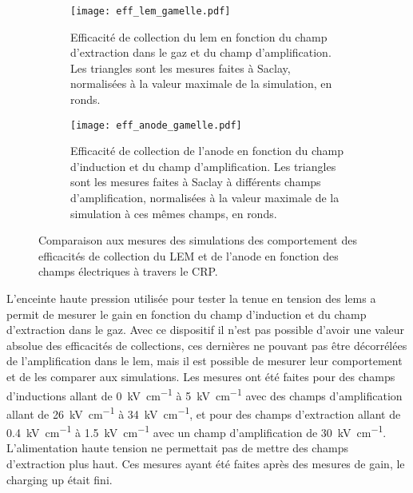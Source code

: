       \begin{figure}[!htb]
        \begin{subfigure}{0.48\textwidth}
          \centering
          \texttt{[image: eff\_lem\_gamelle.pdf]}
          \caption{\label{fig::eff_lem_gamelle}Efficacité de collection du \gls{lem} en fonction du champ d'extraction dans le gaz et du champ d'amplification. Les triangles sont les mesures faites à Saclay, normalisées à la valeur maximale de la simulation, en ronds.}
        \end{subfigure}\hfill
        \begin{subfigure}{0.48\textwidth}
          \centering
          \texttt{[image: eff\_anode\_gamelle.pdf]}
          \caption{\label{fig::eff_anode_gamelle}Efficacité de collection de l'anode en fonction du champ d'induction et du champ d'amplification. Les triangles sont les mesures faites à Saclay à différents champs d'amplification, normalisées à la valeur maximale de la simulation à ces mêmes champs, en ronds.}
        \end{subfigure}
        \caption[Comparaison aux mesures des simulations des efficacités de collection du LEM et de l'anode en fonction des champs électriques à travers le CRP]{\label{fig::eff_gamelle}Comparaison aux mesures des simulations des comportement des efficacités de collection du LEM et de l'anode en fonction des champs électriques à travers le CRP.}
      \end{figure}
      
      L'enceinte haute pression utilisée pour tester la tenue en tension des \glspl{lem} a permit de mesurer le gain en fonction du champ d'induction et du champ d'extraction dans le gaz. Avec ce dispositif il n'est pas possible d'avoir une valeur absolue des efficacités de collections, ces dernières ne pouvant pas être décorrélées de l'amplification dans le \gls{lem}, mais il est possible de mesurer leur comportement et de les comparer aux simulations. Les mesures ont été faites pour des champs d'inductions allant de \SI{0}{\kilo\volt\per\centi\meter} à \SI{5}{\kilo\volt\per\centi\meter} avec des champs d'amplification allant de \SI{26}{\kilo\volt\per\centi\meter} à \SI{34}{\kilo\volt\per\centi\meter}, et pour des champs d'extraction allant de \SI{0.4}{\kilo\volt\per\centi\meter} à \SI{1.5}{\kilo\volt\per\centi\meter} avec un champ d'amplification de \SI{30}{\kilo\volt\per\centi\meter}. L'alimentation haute tension ne permettait pas de mettre des champs d'extraction plus haut. Ces mesures ayant été faites après des mesures de gain, le charging up était fini. 

